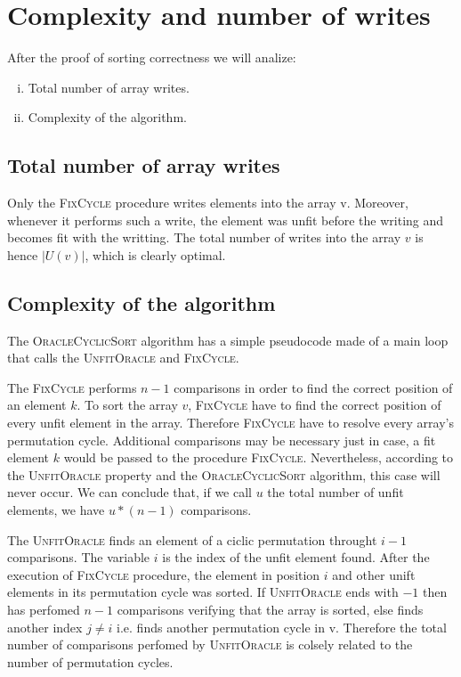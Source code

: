 \section{Complexity and number of writes}

After the proof of sorting correctness we will analize:
\begin{enumerate}[i.]
\item Total number of array writes.
\item Complexity of the algorithm.
\end{enumerate}

\subsection{Total number of array writes}

Only the \textsc{FixCycle} procedure writes elements into the array v.
Moreover, whenever it performs such a write, the element was unfit 
before the writing and becomes fit with the writting.
The total number of writes into the array $v$ is hence $|U(v)|$, which is 
clearly optimal.

\subsection{Complexity of the algorithm}

The \textsc{OracleCyclicSort} algorithm has a simple pseudocode made of a main loop that calls the \textsc{UnfitOracle} and \textsc{FixCycle}.

The \textsc{FixCycle} performs $n-1$ comparisons in order to find the correct position of an element $k$. To sort the array $v$, \textsc{FixCycle} have to find the correct position of every unfit element in the array. Therefore \textsc{FixCycle} have to resolve every array's permutation cycle.
Additional comparisons may be necessary just in case, a fit element $k$ would be passed to the procedure \textsc{FixCycle}. Nevertheless, according to the \textsc{UnfitOracle} property and the \textsc{OracleCyclicSort} algorithm, this case will never occur.
We can conclude that, if we call $u$ the total number of unfit elements, we have $u*(n-1)$ comparisons.

The \textsc{UnfitOracle} finds an element of a ciclic permutation throught $i-1$ comparisons. The variable $i$ is the index of the unfit element found.
After the execution of \textsc{FixCycle} procedure, the element in position $i$ and other unift elements in its permutation cycle was sorted.
If \textsc{UnfitOracle} ends with $-1$ then has perfomed $n-1$ comparisons verifying that the array is sorted, else finds another index $j \neq i$ i.e. finds another permutation cycle in v. Therefore the total number of comparisons perfomed by \textsc{UnfitOracle} is colsely related to the number of permutation cycles.

